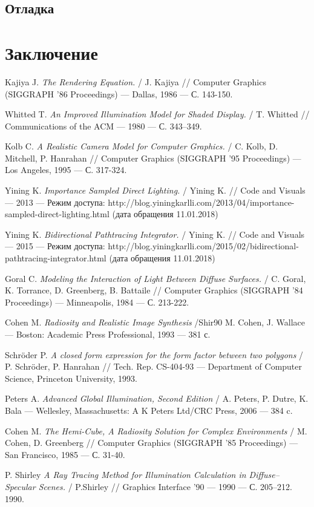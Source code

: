 \documentclass[12pt]{article}
\begin{document}
\subsection{Отладка}
\newpage\section*{Заключение}

\newpage
\begin{thebibliography}{9} %
Kajiya J.
\textit{The Rendering Equation.} / 
J. Kajiya //
Computer Graphics (SIGGRAPH ’86 Proceedings) --- Dallas, 1986 --- С. 143-150.

Whitted T.
\textit{An Improved Illumination Model for Shaded Display.} / 
T. Whitted //
Communications of the ACM --- 1980 --- С. 343–349.

Kolb C.
\textit{A Realistic Camera Model for Computer Graphics.} /
C. Kolb, D. Mitchell, P. Hanrahan //
Computer Graphics (SIGGRAPH ’95 Proceedings) --- Los Angeles, 1995 --- С. 317-324.

Yining K.
\textit{Importance Sampled Direct Lighting.} / 
Yining K. //
Code and Visuals --- 2013 --- Режим доступа: http://blog.yiningkarlli.com/2013/04/importance-sampled-direct-lighting.html (дата обращения 11.01.2018)

Yining K.
\textit{Bidirectional Pathtracing Integrator.} / 
Yining K. //
Code and Visuals --- 2015 --- Режим доступа: http://blog.yiningkarlli.com/2015/02/bidirectional-pathtracing-integrator.html (дата обращения 11.01.2018)

Goral C.
\textit{Modeling the Interaction of Light Between Diffuse Surfaces.} /
C. Goral, K. Torrance, D. Greenberg, B. Battaile //
Computer Graphics (SIGGRAPH ’84 Proceedings) --- Minneapolis, 1984 --- С. 213-222.

Cohen M.
\textit{Radiosity and Realistic Image Synthesis} /Shir90
M. Cohen, J. Wallace
--- Boston: Academic Press Professional, 1993 --- 381 с.

Schr{\"o}der P.
\textit{A closed form expression for the form factor between two polygons} /
P. Schr{\"o}der, P. Hanrahan //
Tech. Rep. CS-404-93 --- Department of Computer Science, Princeton University, 1993.

Peters A.
\textit{Advanced Global Illumination, Second Edition} /
A. Peters, P. Dutre, K. Bala
--- Wellesley, Massachusetts: A K Peters Ltd/CRC Press, 2006 --- 384 c.

Cohen M.
\textit{The Hemi-Cube, A Radiosity Solution for Complex Environments} /
M. Cohen, D. Greenberg //
Computer Graphics (SIGGRAPH ’85 Proceedings) --- San Francisco, 1985 --- С. 31-40.

P. Shirley
\textit{A Ray Tracing Method for Illumination Calculation in Diffuse–Specular Scenes.} /
P.Shirley //
Graphics Interface '90 --- 1990 --- С. 205–212.
1990.


\end{thebibliography}
\end{document}
